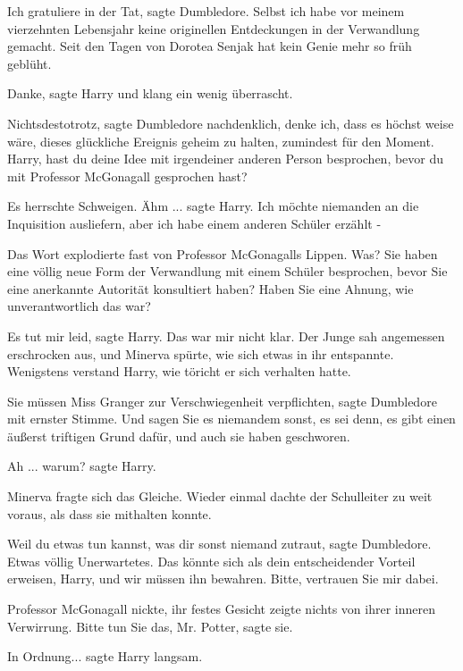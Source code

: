 \glqq{}Ich gratuliere in der Tat\grqq{}, sagte Dumbledore. \glqq{}Selbst ich habe
vor meinem vierzehnten Lebensjahr keine originellen Entdeckungen in der
Verwandlung gemacht. Seit den Tagen von Dorotea Senjak hat kein Genie mehr so
früh geblüht.\grqq{}

\glqq{}Danke\grqq{}, sagte Harry und klang ein wenig überrascht.

\glqq{}Nichtsdestotrotz\grqq{}, sagte Dumbledore nachdenklich, \glqq{}denke ich,
dass es höchst weise wäre, dieses glückliche Ereignis geheim zu halten,
zumindest für den Moment. Harry, hast du deine Idee mit irgendeiner anderen
Person besprochen, bevor du mit Professor McGonagall gesprochen hast?\grqq{}

Es herrschte Schweigen. \glqq{}Ähm ...\grqq{} sagte Harry. \glqq{}Ich möchte
niemanden an die Inquisition ausliefern, aber ich habe einem anderen Schüler
erzählt -\grqq{}

Das Wort explodierte fast von Professor McGonagalls Lippen. \glqq{}Was? Sie haben
eine völlig neue Form der Verwandlung mit einem Schüler besprochen, bevor Sie
eine anerkannte Autorität konsultiert haben? Haben Sie eine Ahnung, wie
unverantwortlich das war?\grqq{}

\glqq{}Es tut mir leid\grqq{}, sagte Harry. \glqq{}Das war mir nicht klar.\grqq{}
Der Junge sah angemessen erschrocken aus, und Minerva spürte, wie sich etwas in
ihr entspannte. Wenigstens verstand Harry, wie töricht er sich verhalten hatte.

\glqq{}Sie müssen Miss Granger zur Verschwiegenheit verpflichten\grqq{}, sagte
Dumbledore mit ernster Stimme. \glqq{}Und sagen Sie es niemandem sonst, es sei
denn, es gibt einen äußerst triftigen Grund dafür, und auch sie haben
geschworen.\grqq{}

\glqq{}Ah ... warum?\grqq{} sagte Harry.

Minerva fragte sich das Gleiche. Wieder einmal dachte der Schulleiter zu weit
voraus, als dass sie mithalten konnte.

\glqq{}Weil du etwas tun kannst, was dir sonst niemand zutraut\grqq{}, sagte
Dumbledore. \glqq{}Etwas völlig Unerwartetes. Das könnte sich als dein
entscheidender Vorteil erweisen, Harry, und wir müssen ihn bewahren. Bitte,
vertrauen Sie mir dabei.\grqq{}

Professor McGonagall nickte, ihr festes Gesicht zeigte nichts von ihrer inneren
Verwirrung. \glqq{}Bitte tun Sie das, Mr. Potter\grqq{}, sagte sie.

\glqq{}In Ordnung...\grqq{} sagte Harry langsam.

